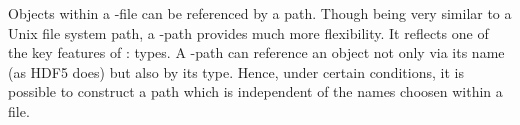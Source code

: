
\newcommand{\fsection}{\textit{file section}}
\newcommand{\fsep}{\texttt{://}}
\newcommand{\osection}{\textit{object section}}
\newcommand{\asep}{\texttt{@}}
\newcommand{\asection}{\textit{attribute section}}
\newcommand{\nsection}{\textit{name section}}
\newcommand{\csection}{\textit{class section}}
\newcommand{\csep}{\texttt{:}}
\newcommand{\osep}{\texttt{/}}
\newcommand{\cgroup}{\texttt{.}}
\newcommand{\pgroup}{\texttt{..}}

Objects within a \nexus-file can be referenced by a path. Though being very
similar to a Unix file system path, a \nexus-path provides much more
flexibility. It reflects one of the key features of \nexus: types. 
A \nexus-path can reference an object not only via its name (as HDF5 does) but
also by its type. Hence, under certain conditions, it is possible to construct
a path which is independent of the names choosen within a file.


